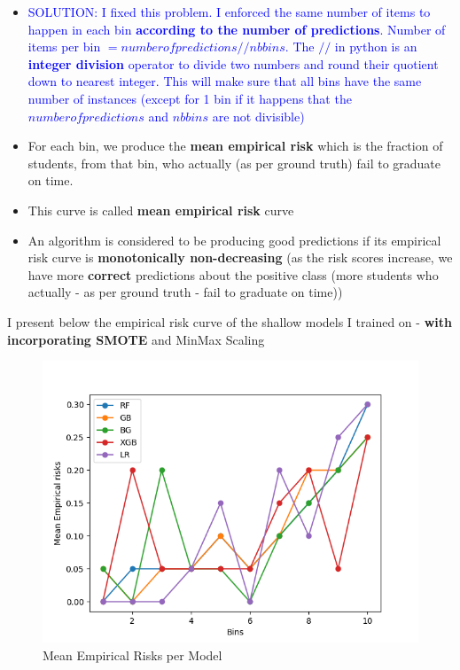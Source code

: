\documentclass{article}
\begin{document}
\begin{itemize}
\item \textcolor{blue}{SOLUTION: I fixed this problem. I enforced the same number of items to happen in each bin \textbf{according to the number of predictions}. Number of items per bin $= number of predictions // nb bins $. The $//$ in python is an \textbf{integer division} operator to divide two numbers and round their quotient down to nearest integer. This will make sure that all bins have the same number of instances (except for 1 bin if it happens that the $number of predictions$ and $nb bins$ are not divisible)}


\item For each bin, we produce the \textbf{mean empirical risk} which is the fraction of students, from that bin, who actually (as per ground truth) fail to graduate on time.
\item This curve is called \textbf{mean empirical risk} curve
\item An algorithm is considered to be producing good predictions if its empirical risk curve is \textbf{monotonically non-decreasing} (as the risk scores increase, we have more \textbf{correct} predictions about the positive class (more students who actually - as per ground truth - fail to graduate on time))
\end{itemize}

I present below the empirical risk curve of the shallow models I trained on - \textbf{with incorporating SMOTE} and MinMax Scaling
\begin{figure}[H]
\centering
\includegraphics[scale=0.5]{plots/toydata/meanempiricalrisks.png}
\caption{Mean Empirical Risks per Model}
\label{Fig:MeanEmpiricalRisks}
\end{figure}
\end{document}
